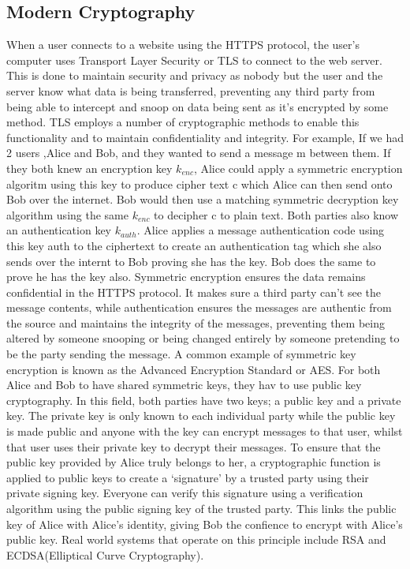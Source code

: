 \documentclass[10pt,a4paper]{article}
\begin{document}
\subsection{Modern Cryptography}
When a user connects to a website using the HTTPS protocol, the user's computer uses Transport Layer Security or TLS to connect to the web server. This is done to maintain security and privacy as nobody but the user and the server know what data is being transferred, preventing any third party from being able to intercept and snoop on data being sent as it's encrypted by some method. TLS employs a number of cryptographic methods to enable this functionality and to maintain confidentiality and integrity.
\newline
\newline
For example, If we had 2 users ,Alice and Bob, and they wanted to send a message m between them. If they both knew an encryption key \(k_{enc}\), Alice could apply a symmetric encryption algoritm using this key to produce cipher text c which Alice can then send onto Bob over the internet. Bob would then use a matching symmetric decryption key algorithm using the same \(k_{enc}\) to decipher c to plain text. Both parties also know an authentication key \(k_{auth}\). Alice applies a message authentication code using this key auth to the ciphertext to create an authentication tag which she also sends over the internt to Bob proving she has the key. Bob does the same to prove he has the key also. Symmetric encryption ensures the data remains confidential in the HTTPS protocol. It makes sure a third party can't see the message contents, while authentication ensures the messages are authentic from the source and maintains the integrity of the messages, preventing them being altered by someone snooping or being changed entirely by someone pretending to be the party sending the message. A common example of symmetric key encryption is known as the Advanced Encryption Standard or AES.
\newline For both Alice and Bob to have shared symmetric keys, they hav to use public key cryptography. In this field, both parties have two keys; a public key and a private key. The private key is only known to each individual party while the public key is made public and anyone with the key can encrypt messages to that user, whilst that user uses their private key to decrypt their messages.
\newline To ensure that the public key provided by Alice truly belongs to her,  a cryptographic function is applied to public keys to create a `signature' by a trusted party using their private signing key. Everyone can verify this signature using a verification algorithm using the public signing key of the trusted party. This links the public key of Alice with Alice's identity, giving Bob the confience to encrypt with Alice's public key. Real world systems that operate on this principle include RSA and ECDSA(Elliptical Curve Cryptography).
\end{document}
